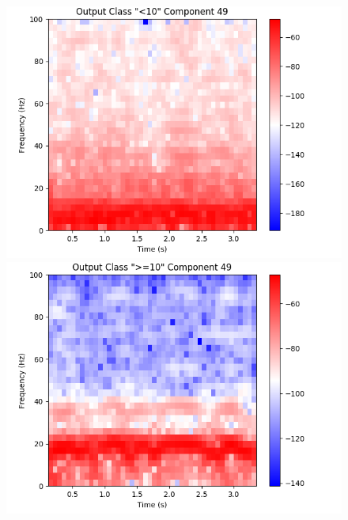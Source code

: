 \documentclass[fleqn,10pt]{wlscirep}
\begin{document}
\begin{figure}
\begin{minipage}{0.24\textwidth}
    \includegraphics[width=\linewidth]{max_act/artificial_spec_49_0.png}
    \subcaption{}
  \end{minipage}
  \hspace*{\fill} 
  \begin{minipage}{0.24\textwidth}
    \includegraphics[width=\linewidth]{max_act/artificial_spec_49_1.png}
    \subcaption{}
  \end{minipage}
  \begin{minipage}{0.24\textwidth}

\end{minipage}
\end{figure}
\end{document}
